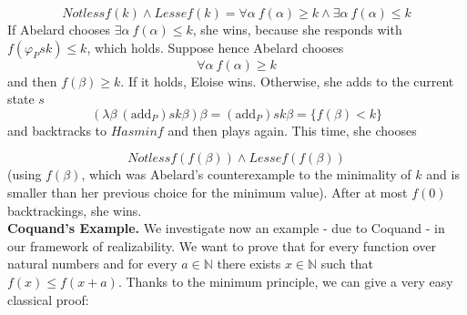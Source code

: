 \documentclass[copyright,creativecommons]{eptcs}
\newcommand{\NatSet}                   {\mathbb{N}}
\newcommand{\comment}[1]{}
\newcommand{\add}                      { {\mbox{add}} }
\begin{document}
\[Notlessf(k)\land Lessef (k)=\forall \alpha\ f(\alpha) \geq k \land \exists \alpha\ f(\alpha)\leq k \]
If Abelard chooses $\exists \alpha\ f(\alpha)\leq k$, she wins, because she responds with $f(\varphi_Psk)\leq k$, which holds. Suppose hence Abelard chooses \[\forall \alpha\ f(\alpha) \geq k\] and then $f(\beta)\geq k$. If it holds, Eloise wins. Otherwise, she adds to the current state $s$
\[(\lambda \beta\ (\add_P)s k\beta)\beta= (\add_P)s k\beta=\{f(\beta)<k\}\]
 and backtracks to $Hasminf$ and then plays again. This time, she chooses 
 
 \[Notlessf(f(\beta))\land Lessef (f(\beta))\]
 (using $f(\beta)$, which was Abelard's counterexample to the minimality of $k$ and is smaller than her previous choice for the minimum value). After at most $f(0)$ backtrackings, she wins. \\
 
 
 \textbf{Coquand's Example.} We investigate now an example -  due to
Coquand - in our framework of realizability. We want to prove that
for every function over natural numbers and  for every
$a\in\NatSet$ there exists $x\in\NatSet$ such that $f(x)\leq
f(x+a)$. Thanks to the minimum principle, we can give a very easy
classical proof:
\comment{
\begin{prooftree}
\AxiomC{$h: Hasminf$}
            \AxiomC{$w: Notlessf(\mu)\land Lessef(\mu)$}
            \UnaryInfC{$\pi_1w: Lessef(\mu)$}
                  \AxiomC{$w: Notlessf(\mu)\land Lessef(\mu)$}
                  \UnaryInfC{$\pi_0 w: Notlessf (\mu)$}
                  \UnaryInfC{$\pi_0w(z+a): f(z+a)\geq \mu$}

                                   \AxiomC{$v: f(z)\leq \mu$}
                  \BinaryInfC{$\pi_0w(z+a)\Cup v: f(z)\leq f(z+a)$}
                  \UnaryInfC{$\langle z,\pi_0w(z+a)\Cup v\rangle :
\exists x
f(x)\leq f(x+a)$}
                  \UnaryInfC{$\lambda a \langle z,\pi_0w(z+a)\Cup
v\rangle :
\forall a \exists x f(x)\leq f(x+a)$}
                                    \BinaryInfC{$\lambda a
\langle \pi_0\pi_1w,\pi_0w(\pi_0\pi_1w+a)\Cup
\pi_1\pi_1w\rangle : \forall a \exists
x f(x)\leq f(x+a)$}
\BinaryInfC{$\lambda a
\langle \pi_0\pi_1\pi_1h,\pi_0\pi_1h(\pi_0\pi_1\pi_1h+a)\Cup
\pi_1\pi_1\pi_1h\rangle : \forall a \exists x f(x)\leq f(x+a)$}
\end{prooftree}}
\end{document}

